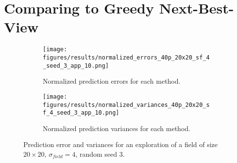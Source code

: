 \section{Comparing to Greedy Next-Best-View} \label{sec:s3_nbvcomp}

\begin{figure}[htb!]
    \centering
    \begin{subfigure}[t]{0.5\textwidth}
        \centering
        \texttt{[image: figures/results/normalized\_errors\_40p\_20x20\_sf\_4\_seed\_3\_app\_10.png]}
        \ssp
        \captionsetup{skip=0.20\baselineskip,size=footnotesize}
        \caption{Normalized prediction errors for each method.}
    \end{subfigure}%
    \begin{subfigure}[t]{0.5\textwidth}
        \centering
        \texttt{[image: figures/results/normalized\_variances\_40p\_20x20\_sf\_4\_seed\_3\_app\_10.png]}
        \ssp
        \captionsetup{skip=0.20\baselineskip,size=footnotesize}
        \caption{Normalized prediction variances for each method.}
    \end{subfigure}%
    \ssp
    \captionsetup{skip=0.20\baselineskip}
    \caption{Prediction error and variances for an exploration of a field of size $20 \times 20$, $\sigma_{field} = 4$, random seed 3.}
    \label{fig:s3_nbvcomp}
\end{figure}

